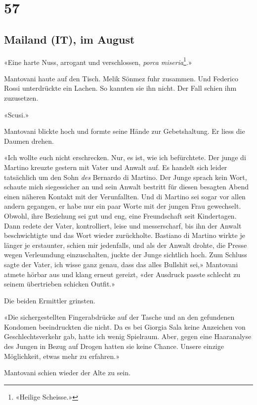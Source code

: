 \chapter{57}

\section{Mailand (IT), im 
August}

«Eine harte Nuss, arrogant und verschlossen, \emph{porca miseria}\footnote{«Heilige Scheisse.»}.»

Mantovani haute auf den Tisch. Melik Sönmez fuhr zusammen. Und Federico Rossi unterdrückte
ein Lachen.
So kannten sie ihn nicht. Der Fall schien ihm zuzusetzen.

«Scusi.»

Mantovani blickte hoch und formte seine Hände zur Gebetshaltung. Er
liess die Daumen drehen.

«Ich wollte euch nicht erschrecken. Nur, es ist, wie ich befürchtete.
Der junge di Martino kreuzte gestern mit Vater und Anwalt auf. Es
handelt sich leider tatsächlich um den Sohn \emph{des} Bernardo di
Martino. Der Junge sprach kein Wort, schaute mich siegessicher an und
sein Anwalt bestritt für diesen besagten Abend einen näheren Kontakt mit
der Verunfallten. Und di Martino sei sogar vor allen andern gegangen, er
habe nur ein paar Worte mit der jungen Frau gewechselt. Obwohl, ihre
Beziehung sei gut und eng, eine Freundschaft seit Kindertagen. Dann
redete der Vater, kontrolliert, leise und messerscharf, bis ihn der
Anwalt beschwichtigte und das Wort wieder zurückholte.
Bastiano di Martino wirkte je länger je erstaunter, schien mir
jedenfalls, und als der Anwalt drohte, die Presse wegen Verleumdung
einzuschalten, juckte der Junge sichtlich hoch. Zum Schluss sagte der
Vater, ich wisse ganz genau, dass das alles Bullshit sei,» Mantovani atmete hörbar aus und klang erneut gereizt, 
«der Ausdruck passte schlecht zu seinem übertrieben schicken Outfit.»

Die beiden Ermittler grinsten. 

«Die sichergestellten Fingerabdrücke auf der Tasche und an den
gefundenen Kondomen beeindruckten die nicht. Da es bei Giorgia Sala keine
Anzeichen von Geschlechtsverkehr gab, hatte ich wenig
Spielraum. Aber, gegen eine Haaranalyse des Jungen in Bezug auf Drogen
hatten sie keine Chance. Unsere einzige Möglichkeit, etwas mehr zu
erfahren.»

Mantovani schien wieder der Alte zu sein.

